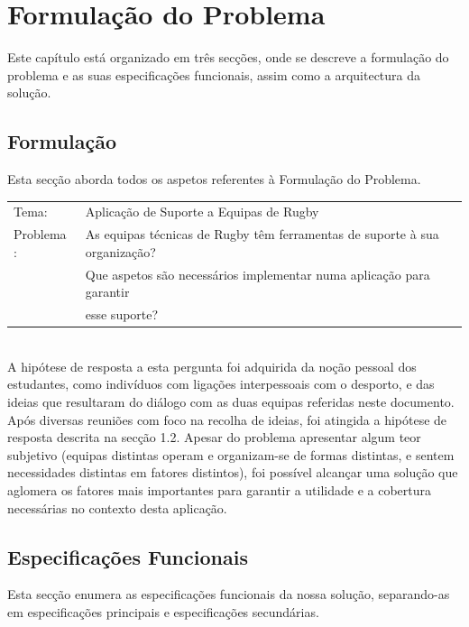 %
%
%
\chapter{Formulação do Problema} \label{cap:formulacao}

Este capítulo está organizado em três secções, onde se descreve a formulação do problema e as suas especificações funcionais, assim como a arquitectura da solução.\\

\section{Formulação}\label{sec21}
Esta secção aborda todos os aspetos referentes à Formulação do Problema.\\

\begin{tabular}{ll}
	Tema: & Aplicação de Suporte a Equipas de Rugby \\
	Problema : & As equipas técnicas de Rugby têm ferramentas de suporte à sua organização? \\
		&	Que aspetos são necessários implementar numa aplicação para garantir \\
		&	esse suporte?\\
\end{tabular}\\[10mm]
A hipótese de resposta a esta pergunta foi adquirida da noção pessoal dos estudantes, como indivíduos com ligações interpessoais com o desporto, e das ideias que resultaram do diálogo com as duas equipas referidas neste documento. Após diversas reuniões com foco na recolha de ideias, foi atingida a hipótese de resposta descrita na secção 1.2. Apesar do problema apresentar algum teor subjetivo (equipas distintas operam e organizam-se de formas distintas, e sentem necessidades distintas em fatores distintos), foi possível alcançar uma solução que aglomera os fatores mais importantes para garantir a utilidade e a cobertura necessárias no contexto desta aplicação.

\section{Especificações Funcionais}\label{sec22}
Esta secção enumera as especificações funcionais da nossa solução, separando-as em especificações principais e especificações secundárias.

